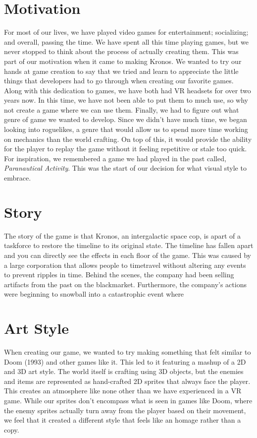 \documentclass{sigchi}
\begin{document}
\section{Motivation}
For most of our lives, we have played video games for entertainment; socializing; and overall, passing the time. We have spent all this time playing games, but we never stopped to think about the process of actually creating them. This was part of our motivation when it came to making Kronos. We wanted to try our hands at game creation to say that we tried and learn to appreciate the little things that developers had to go through when creating our favorite games. Along with this dedication to games, we have both had VR headsets for over two years now. In this time, we have not been able to put them to much use, so why not create a game where we can use them. Finally, we had to figure out what genre of game we wanted to develop. Since we didn’t have much time, we began looking into roguelikes, a genre that would allow us to spend more time working on mechanics than the world crafting. On top of this, it would provide the ability for the player to replay the game without it feeling repetitive or stale too quick. For inspiration, we remembered a game we had played in the past called, \textit{Paranautical Activity}. This was the start of our decision for what visual style to embrace.

\section{Story}
The story of the game is that Kronos, an intergalactic space cop, is apart of a taskforce to restore the timeline to its original state. The timeline has fallen apart and you can directly see the effects in each floor of the game. This was caused by a large corporation that allows people to timetravel without altering any events to prevent ripples in time. Behind the scenes, the company had been selling artifacts from the past on the blackmarket. Furthermore, the company's actions were beginning to snowball into a catastrophic event where 

\section{Art Style}
When creating our game, we wanted to try making something that felt similar to Doom (1993) and other games like it. This led to it featuring a mashup of a 2D and 3D art style. The world itself is crafting using 3D objects, but the enemies and items are represented as hand-crafted 2D sprites that always face the player. This creates an atmosphere like none other than we have experienced in a VR game. While our sprites don’t encompass what is seen in games like Doom, where the enemy sprites actually turn away from the player based on their movement, we feel that it created a different style that feels like an homage rather than a copy.
\end{document}

